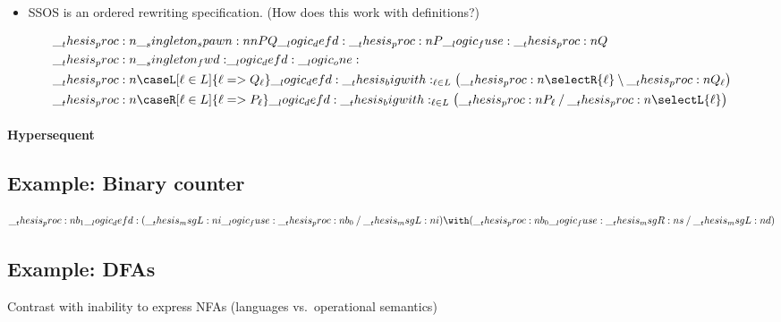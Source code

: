 
\begin{itemize}
\item SSOS is an ordered rewriting specification.  (How does this work with definitions?)
\end{itemize}

\begin{equation*}
  \begin{lgathered}
    \proc{\spawn{P}{Q}} \defd \proc{P} \fuse \proc{Q} \\
    \proc{\fwd} \defd \one \\
    \proc{\caseL[\ell \in L]{\ell => Q_{\ell}}} \defd \bigwith_{\ell \in L}\bigl(\proc{\selectR{\ell}} \limp \proc{Q_{\ell}}\bigr) \\
    \proc{\caseR[\ell \in L]{\ell => P_{\ell}}} \defd \bigwith_{\ell \in L}\bigl(\proc{P_{\ell}} \pmir \proc{\selectL{\ell}}\bigr)
  \end{lgathered}
\end{equation*}

\paragraph{Hypersequent}



\subsection{Example: Binary counter}

\begin{equation*}
  \proc{b_1} \defd (\msgL{i} \fuse \proc{b_0} \pmir \msgL{i}) \with (\proc{b_0} \fuse \msgR{s} \pmir \msgL{d})
\end{equation*}

\subsection{Example: \Aclp*{DFA}}

Contrast with inability to express \acp{NFA} (languages vs.\ operational semantics)

